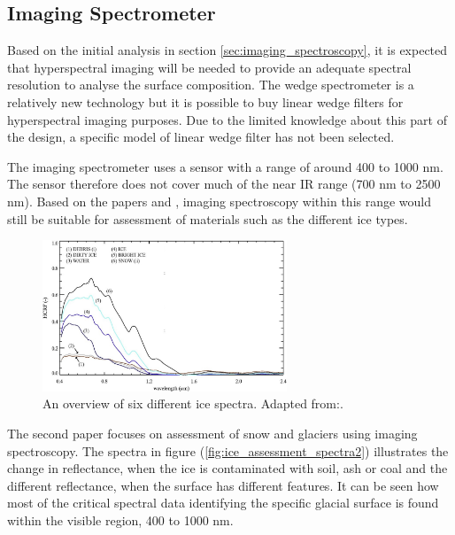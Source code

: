 \subsection{Imaging Spectrometer}
Based on the initial analysis in section \ref{sec:imaging_spectroscopy}, it is expected that hyperspectral imaging will be needed to provide an adequate spectral resolution to analyse the surface composition. The wedge spectrometer is a relatively new technology but it is possible to buy linear wedge filters for hyperspectral imaging purposes. Due to the limited knowledge about this part of the design, a specific model of linear wedge filter has not been selected.

The imaging spectrometer uses a sensor with a range of around 400 to 1000 nm. The sensor therefore does not cover much of the near IR range (700 nm to 2500 nm). Based on the papers \cite{naegeli2015a} and \cite{negi2015a}, imaging spectroscopy within this range would still be suitable for assessment of materials such as the different ice types.
\begin{figure}[htb]
\centering
\includegraphics[width=0.65\textwidth]{figures/Orbiter/ice_surface_assessment_spectra}
\caption{An overview of six different ice spectra. Adapted from:\cite{naegeli2015a}.}
\label{fig:ice_assessment_spectra}
\end{figure}
The second paper focuses on assessment of snow and glaciers using imaging spectroscopy\cite{negi2015a}. The spectra in figure (\ref{fig:ice_assessment_spectra2}) illustrates the change in reflectance, when the ice is contaminated with soil, ash or coal and the different reflectance, when the surface has different features. It can be seen how most of the critical spectral data identifying the specific glacial surface is found within the visible region, 400 to 1000 nm.
